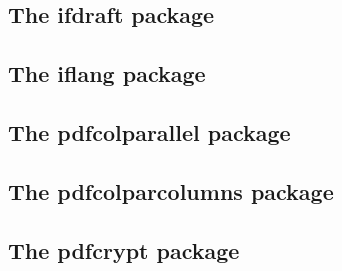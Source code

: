 \documentclass[a4paper,12pt]{article}
\makeatletter
\providecommand*{\pdfTeX}{pdf\TeX}
\providecommand*{\VTeX}{V\TeX}
\newcommand*{\xpackage}[1]{\textsf{#1}}
\newcommand*{\xoption}[1]{\textsf{#1}}
\newcommand*{\cs}[1]{\texttt{\textbackslash#1}}
\newcommand*{\tocinclude}[1]{%
  \setcounter{tocdepth}{3}%
  \begingroup
    \makeatletter
    \def\@prj{#1}%
    \let\contentsline\foreign@contentsline
  \endgroup
}
\def\foreign@contentsline#1#2#3#4{%
  \ifx\\#4\\%
    \csname l@#1\endcsname{#2}{#3}%
  \else
    \ifHy@linktocpage
      \csname l@#1\endcsname{{#2}}{%
        \hyper@linkfile{#3}{\@prj.pdf}{#4}%
      }%
    \else
      \csname l@#1\endcsname{%
        \hyper@linkfile{#2}{\@prj.pdf}{#4}%
      }{#3}%
    \fi
  \fi
}%
\newcommand*{\pkgsectformat}[1]{%
  \texorpdfstring{%
    \textcolor{link}{The} %
    \xpackage{#1} %
    \textcolor{link}{package}%
  }{#1}%
}
\makeatother
\begin{document}
\newpage
\subsection{\pkgsectformat{ifdraft}}
\label{ifdraft}
\begin{abstract}
The package provides an interface for selecting code depending
on the options \xoption{draft} and \xoption{final}.
\end{abstract}
\tocinclude{ifdraft}

\newpage
\subsection{\pkgsectformat{iflang}}
\label{iflang}
\begin{abstract}
This package provides expandible checks for the current language
based on macro \cs{languagename} or hyphenation patterns.
\end{abstract}
\tocinclude{iflang}

\newpage
\subsection{\pkgsectformat{pdfcolparallel}}
\label{pdfcolparallel}
\begin{abstract}
This packages fixes bugs in \xpackage{parallel} and
improves color support by using several color stacks
that are provided by \pdfTeX\ since version 1.40.
\end{abstract}
\tocinclude{pdfcolparallel}

\newpage
\subsection{\pkgsectformat{pdfcolparcolumns}}
\label{pdfcolparcolumns}
\begin{abstract}
Since version 1.40 \pdfTeX\ supports several color stacks.
This package uses them to fix color problems in
package \xpackage{parcolumns}.
\end{abstract}
\tocinclude{pdfcolparcolumns}

\newpage
\subsection{\pkgsectformat{pdfcrypt}}
\label{pdfcrypt}
\begin{abstract}
This package supports the setting of pdf encryption options
for \VTeX\ and some older versions of \pdfTeX.
\end{abstract}
\tocinclude{pdfcrypt}
\end{document}
